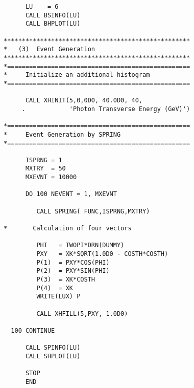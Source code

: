 {\begin{verbatim}
      LU    = 6
      CALL BSINFO(LU)
      CALL BHPLOT(LU)

***************************************************
*   (3)  Event Generation 
***************************************************
*==================================================
*     Initialize an additional histogram
*==================================================

      CALL XHINIT(5,0,0D0, 40.0D0, 40,
     .            'Photon Transverse Energy (GeV)')

*==================================================
*     Event Generation by SPRING
*==================================================

      ISPRNG = 1
      MXTRY  = 50
      MXEVNT = 10000

      DO 100 NEVENT = 1, MXEVNT

         CALL SPRING( FUNC,ISPRNG,MXTRY)

*       Calculation of four vectors

         PHI   = TWOPI*DRN(DUMMY)
         PXY   = XK*SQRT(1.0D0 - COSTH*COSTH)
         P(1)  = PXY*COS(PHI)
         P(2)  = PXY*SIN(PHI)
         P(3)  = XK*COSTH
         P(4)  = XK
         WRITE(LUX) P

         CALL XHFILL(5,PXY, 1.0D0)

  100 CONTINUE

      CALL SPINFO(LU)
      CALL SHPLOT(LU)

      STOP
      END

\end{verbatim}}
